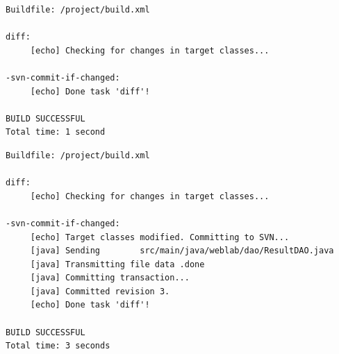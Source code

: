 \begin{lstlisting}[caption={Лог цели \texttt{diff} --- изменений нет},language={},captionpos=b]
Buildfile: /project/build.xml

diff:
     [echo] Checking for changes in target classes...

-svn-commit-if-changed:
     [echo] Done task 'diff'!

BUILD SUCCESSFUL
Total time: 1 second
\end{lstlisting}

\begin{lstlisting}[caption={Лог цели \texttt{diff} --- изменения есть},language={},captionpos=b]
Buildfile: /project/build.xml

diff:
     [echo] Checking for changes in target classes...

-svn-commit-if-changed:
     [echo] Target classes modified. Committing to SVN...
     [java] Sending        src/main/java/weblab/dao/ResultDAO.java
     [java] Transmitting file data .done
     [java] Committing transaction...
     [java] Committed revision 3.
     [echo] Done task 'diff'!

BUILD SUCCESSFUL
Total time: 3 seconds
\end{lstlisting}